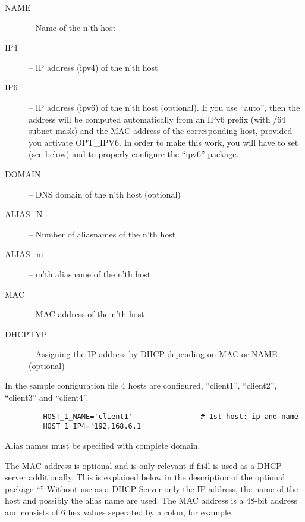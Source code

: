 \begin{description}
{      \begin{description}
      \item[NAME]         -- Name of the n'th host
      \item[IP4]          -- IP address (ipv4) of the n'th host
      \item[IP6]          -- IP address (ipv6) of the n'th host (optional). If
                             you use ``auto'', then the address will be computed
                             automatically from an IPv6 prefix (with /64 subnet
                             mask) and the MAC address of the corresponding
                             host, provided you activate OPT\_IPV6. In order
                             to make this work, you will have to set
                              (see below) and to properly
                             configure the ``ipv6'' package.
      \item[DOMAIN]       -- DNS domain of the n'th host (optional)
      \item[ALIAS\_N]     -- Number of aliasnames of the n'th host
      \item[ALIAS\_m]     -- m'th aliasname of the n'th host
      \item[MAC]          -- MAC address of the n'th host
      \item[DHCPTYP]      -- Assigning the IP address by DHCP depending on
                             MAC or NAME (optional)
      \end{description}

      In the sample configuration file 4 hosts are configured,
      ``client1'', ``client2'', ``client3'' and ``client4''.

\begin{example}
\begin{verbatim}
         HOST_1_NAME='client1'                # 1st host: ip and name
         HOST_1_IP4='192.168.6.1'
\end{verbatim}
\end{example}

      Alias names must be specified with complete domain.

      The MAC address is optional and is only relevant if
      fli4l is used as a DHCP server additionally. This is explained below in
      the description of the optional package ``''
      Without use as a DHCP Server only the IP address,
      the name of the host and possibly the alias name are used. The MAC
      address is a 48-bit address and consists of 6 hex values seperated
      by a colon, for example

}
\end{description}
